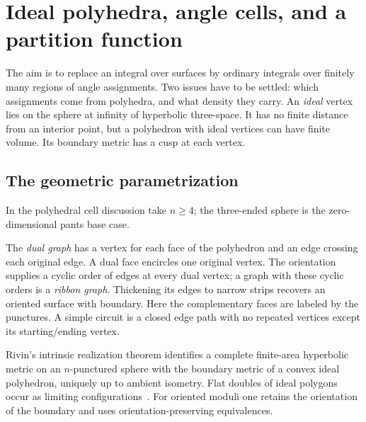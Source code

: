 \section{Ideal polyhedra, angle cells, and a partition function}
\label{sec:idealcells}

The aim is to replace an integral over surfaces by ordinary integrals
over finitely many regions of angle assignments. Two issues have to
be settled: which assignments come from polyhedra, and what density
they carry. An \emph{ideal} vertex lies on the sphere at infinity of
hyperbolic three-space. It has no finite distance from an interior
point, but a polyhedron with ideal vertices can have finite volume.
Its boundary metric has a cusp at each vertex.

\subsection{The geometric parametrization}

In the polyhedral cell discussion take $n\ge4$; the three-ended sphere is
the zero-dimensional pants base case.

The \emph{dual graph} has a vertex for each face of the polyhedron
and an edge crossing each original edge. A dual face encircles one
original vertex. The orientation supplies a cyclic order of edges
at every dual vertex; a graph with these cyclic orders is a
\emph{ribbon graph}. Thickening its edges to narrow strips recovers
an oriented surface with boundary. Here the complementary faces
are labeled by the punctures. A simple circuit is a closed edge
path with no repeated vertices except its starting/ending vertex.

Rivin's intrinsic realization theorem identifies a complete finite-area
hyperbolic metric on an $n$-punctured sphere with the boundary metric of a
convex ideal polyhedron, uniquely up to ambient isometry. Flat doubles of
ideal polygons occur as limiting configurations~\cite{RivinIntrinsic}.
For oriented moduli one retains the orientation of the boundary and uses
orientation-preserving equivalences.


